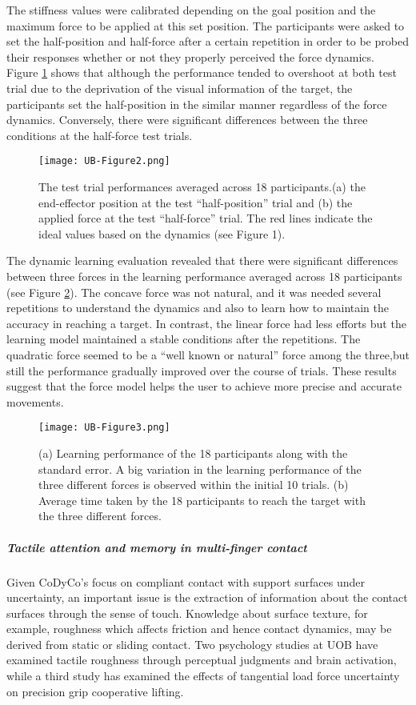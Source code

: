 The stiffness values were calibrated depending on the goal position and the maximum force to be applied at this set position. The participants were asked to set the half-position and half-force after a certain repetition in order to be probed their responses whether or not they properly perceived the force dynamics. Figure \ref{fig:testrial} shows that although the performance tended to overshoot at both test trial due to the deprivation of the visual information of the target, the participants set the half-position in the similar manner regardless of the force dynamics. Conversely, there were significant differences between the three conditions at the half-force test trials.

\begin{figure}[h!]
	\centering
	\texttt{[image: UB-Figure2.png]}
	\caption{The test trial performances averaged across 18 participants.(a) the end-effector position at the test “half-position” trial and (b) the applied force at the test “half-force” trial. The red lines indicate the ideal values based on the dynamics (see Figure 1).}
	\label{fig:testrial}
\end{figure}

\bigbreak
\bigbreak
The dynamic learning evaluation revealed that there were significant differences between three forces in the learning performance averaged across 18 participants (see Figure \ref{fig:learnerror}). The concave force was not natural, and it was needed several repetitions to understand the dynamics and also to learn how to maintain the accuracy in reaching a target. In contrast, the linear force had less efforts but the learning model maintained a stable conditions after the repetitions. The quadratic force seemed to be a “well known or natural” force among the three,but still the performance gradually improved over the course of trials. These results suggest that the force model helps the user to achieve more precise and accurate movements.

\begin{figure}[h!]
	\centering
	\texttt{[image: UB-Figure3.png]}
	\caption{(a) Learning performance of the 18 participants along with the standard error. A big variation in the learning performance of the three different forces is observed within the initial 10 trials. 
		(b) Average time taken by the 18 participants to reach the target with the three different forces.}
	\label{fig:learnerror}
\end{figure}

\subparagraph*{Tactile attention and memory in multi-finger contact}
Given CoDyCo’s focus on compliant contact with support surfaces under uncertainty, an important issue is the extraction of information about the contact surfaces through the sense of touch. Knowledge about surface texture, for example, roughness which affects friction and hence contact dynamics, may be derived from static or sliding contact. Two psychology studies at UOB have examined tactile roughness through perceptual judgments and brain activation, while a third study has examined the effects of tangential load force uncertainty on precision grip cooperative lifting.

